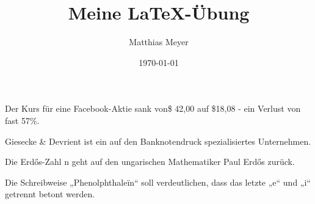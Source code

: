\documentclass[a4paper,twoside,10pt]{article}
\author{Matthias Meyer}
\title{Meine LaTeX-Übung}
\date{\today}
\begin{document}
Der Kurs f\"ur eine Facebook-Aktie sank von\$ 42,00 auf \$18,08 - ein Verlust von fast 57\%.


Giesecke \& Devrient ist ein auf den Banknotendruck spezialisiertes Unternehmen.


Die Erd\H{o}s-Zahl n geht auf den ungarischen Mathematiker Paul Erd\H{o}s zur\"uck.


Die Schreibweise „Phenolphthale\"in“ soll verdeutlichen, dass das letzte „e“ und „i“ getrennt betont werden.
\end{document}
